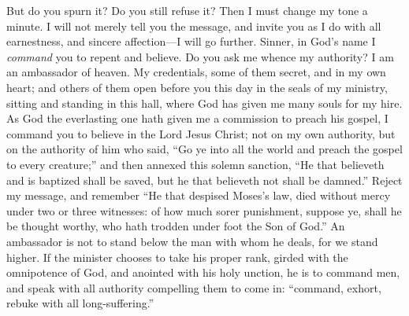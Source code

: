 \documentclass[
]{book}
\begin{document}
But do you spurn it? Do you still refuse it? Then I must change my tone a minute. I will not merely tell you the message, and invite you as I do with all earnestness, and sincere affection---I will go further. Sinner, in God's name I \emph{command} you to repent and believe. Do you ask me whence my authority? I am an ambassador of heaven. My credentials, some of them secret, and in my own heart; and others of them open before you this day in the seals of my ministry, sitting and standing in this hall, where God has given me many souls for my hire. As God the everlasting one hath given me a commission to preach his gospel, I command you to believe in the Lord Jesus Christ; not on my own authority, but on the authority of him who said, ``Go ye into all the world and preach the gospel to every creature;'' and then annexed this solemn sanction, ``He that believeth and is baptized shall be saved, but he that believeth not shall be damned.'' Reject my message, and remember ``He that despised Moses's law, died without mercy under two or three witnesses: of how much sorer punishment, suppose ye, shall he be thought worthy, who hath trodden under foot the Son of God.'' An ambassador is not to stand below the man with whom he deals, for we stand higher. If the minister chooses to take his proper rank, girded with the omnipotence of God, and anointed with his holy unction, he is to command men, and speak with all authority compelling them to come in: ``command, exhort, rebuke with all long-suffering.''
\end{document}
